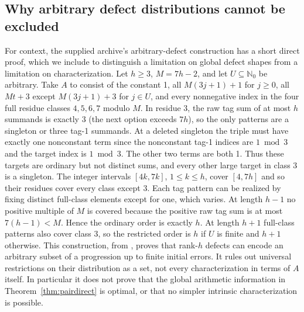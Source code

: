 \documentclass[11pt]{article}
\theoremstyle{remark}\newtheorem{remark}[theorem]{Remark}
\newcommand{\N}{\mathbb N_0}
\begin{document}
\subsection{Why arbitrary defect distributions cannot be excluded}
For context, the supplied archive's arbitrary-defect construction has a short direct proof, which we include to distinguish a limitation on global defect shapes from a limitation on characterization. Let $h\ge3$, $M=7h-2$, and let $U\subseteq\N$ be arbitrary. Take $A$ to consist of the constant 1, all $M(3j+1)+1$ for $j\ge0$, all $Mt+3$ except $M(3j+1)+3$ for $j\in U$, and every nonnegative index in the four full residue classes $4,5,6,7$ modulo $M$. In residue 3, the raw tag sum of at most $h$ summands is exactly 3 (the next option exceeds $7h$), so the only patterns are a singleton or three tag-1 summands. At a deleted singleton the triple must have exactly one nonconstant term since the nonconstant tag-1 indices are $1\bmod3$ and the target index is $1\bmod3$. The other two terms are both 1. Thus these targets are ordinary but not distinct sums, and every other large target in class 3 is a singleton. The integer intervals $[4k,7k]$, $1\le k\le h$, cover $[4,7h]$ and so their residues cover every class except 3. Each tag pattern can be realized by fixing distinct full-class elements except for one, which varies. At length $h-1$ no positive multiple of $M$ is covered because the positive raw tag sum is at most $7(h-1)<M$. Hence the ordinary order is exactly $h$. At length $h+1$ full-class patterns also cover class 3, so the restricted order is $h$ if $U$ is finite and $h+1$ otherwise. This construction, from \cite{archive}, proves that rank-$h$ defects can encode an arbitrary subset of a progression up to finite initial errors. It rules out universal restrictions on their distribution as a set, not every characterization in terms of $A$ itself. In particular it does not prove that the global arithmetic information in Theorem~\ref{thm:pairdirect} is optimal, or that no simpler intrinsic characterization is possible.
\end{document}
